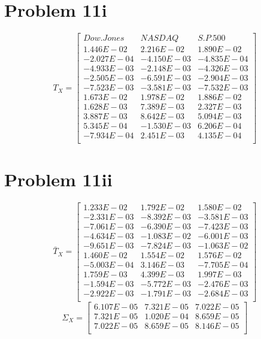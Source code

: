 \documentclass{article}
\begin{document}
\section*{Problem 11i}
\begin{equation*}
T_X = 
\begin{bmatrix}{}
 Dow.Jones & NASDAQ & S.P.500 \\ 
 1.446E-02 & 2.216E-02 & 1.890E-02 \\ 
  -2.027E-04 & -4.150E-03 & -4.835E-04 \\ 
  -4.933E-03 & -2.148E-03 & -4.326E-03 \\ 
  -2.505E-03 & -6.591E-03 & -2.904E-03 \\ 
  -7.523E-03 & -3.581E-03 & -7.532E-03 \\ 
  1.673E-02 & 1.978E-02 & 1.886E-02 \\ 
  1.628E-03 & 7.389E-03 & 2.327E-03 \\ 
  3.887E-03 & 8.642E-03 & 5.094E-03 \\ 
  5.345E-04 & -1.530E-03 & 6.206E-04 \\ 
  -7.934E-04 & 2.451E-03 & 4.135E-04 \\ 
  \end{bmatrix}
\end{equation*}

\section*{Problem 11ii}
\begin{equation*}
\bar{T}_X= \begin{bmatrix}{}
1.233E-02 & 1.792E-02 & 1.580E-02 \\
  -2.331E-03 & -8.392E-03 & -3.581E-03 \\
-7.061E-03 & -6.390E-03 & -7.423E-03 \\
 -4.634E-03 & -1.083E-02 & -6.001E-03 \\
 -9.651E-03 & -7.824E-03 & -1.063E-02 \\
  1.460E-02 & 1.554E-02 & 1.576E-02 \\
-5.003E-04 & 3.146E-03 & -7.705E-04 \\
  1.759E-03 & 4.399E-03 & 1.997E-03 \\
  -1.594E-03 & -5.772E-03 & -2.476E-03 \\
-2.922E-03 & -1.791E-03 & -2.684E-03 \\
\end{bmatrix}
\end{equation*}
\begin{equation*}
\Sigma_X=\begin{bmatrix}{}
  6.107E-05 & 7.321E-05 & 7.022E-05 \\ 
  7.321E-05 & 1.020E-04 & 8.659E-05 \\ 
  7.022E-05 & 8.659E-05 & 8.146E-05 \\ 
  \end{bmatrix}
\end{equation*}
\end{document}
